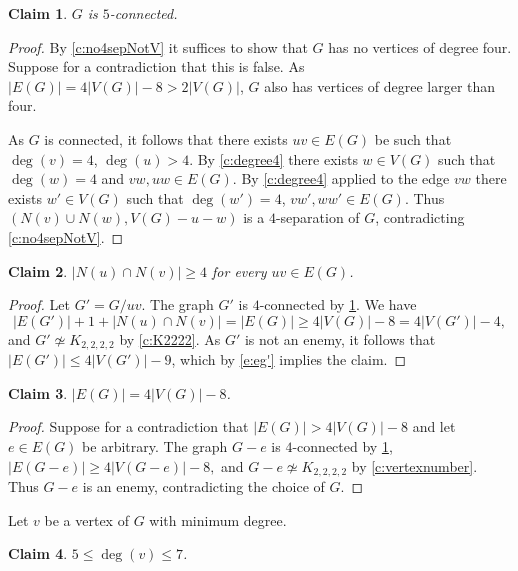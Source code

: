 \documentclass[reqno,final,12pt]{amsart}
\newtheorem{claim}{Claim}[section]
\begin{document}
{\begin{claim}\label{c:5connected} $G$ is $5$-connected.\end{claim}

\begin{proof} By \cref{c:no4sepNotV} it suffices to show that $G$ has no vertices of degree four. Suppose for a contradiction that this is false. As $|E(G)| = 4|V(G)| - 8 > 2|V(G)|$, $G$ also has vertices of degree larger than four.
	
As $G$ is connected, it follows that there exists $uv \in E(G)$ be such that $\deg(v) = 4$, $\deg(u) > 4$. By \cref{c:degree4} there exists 	$w \in V(G)$ such that $\deg(w)=4$ and $vw, uw \in E(G)$. By \cref{c:degree4} applied to the edge $vw$ there exists $w' \in V(G)$ such that 
$\deg(w')=4$, $vw',ww'\in E(G)$. Thus $(N(v) \cup N(w), V(G) - u - w)$ is a $4$-separation of $G$, contradicting \cref{c:no4sepNotV}.
\end{proof}

\begin{claim}\label{c:triangles} $|N(u) \cap N(v)| \geq 4$ for every $uv \in E(G)$.
\end{claim}	

\begin{proof}
Let $G'= G / uv$. The graph $G'$ is $4$-connected by \cref{c:5connected}. We have \begin{equation}\label{e:eg'} |E(G')|  + 1 + |N(u) \cap N(v)| = |E(G)| \geq 4|V(G)|-8  = 4 |V(G')|-4, \end{equation} and $G' \not \simeq K_{2,2,2,2}$ by \cref{c:K2222}.
As $G'$ is not an enemy, it follows that $|E(G')| \leq 4|V(G')| - 9$, which by \eqref{e:eg'} implies the claim. 
\end{proof} 	

\begin{claim}\label{c:edgenumber} $|E(G)| = 4|V(G)|-8$.
 \end{claim}	
 \begin{proof}
 Suppose for a contradiction that $|E(G)| > 4 |V(G)|-8$ and let $e \in E(G)$ be arbitrary. The graph $G - e$ is $4$-connected by \cref{c:5connected},  $|E(G-e)| \geq  4 |V(G-e)|-8,$ and $G - e \not \simeq K_{2,2,2,2}$ by \cref{c:vertexnumber}. Thus $G-e$ is an enemy, contradicting the choice of $G$.
\end{proof} 	

Let $v$ be a vertex of $G$ with minimum degree.
 
\begin{claim}\label{c:mindegree}  $5 \leq \deg(v)  \leq 7$.  
\end{claim}	

}
\end{document}
